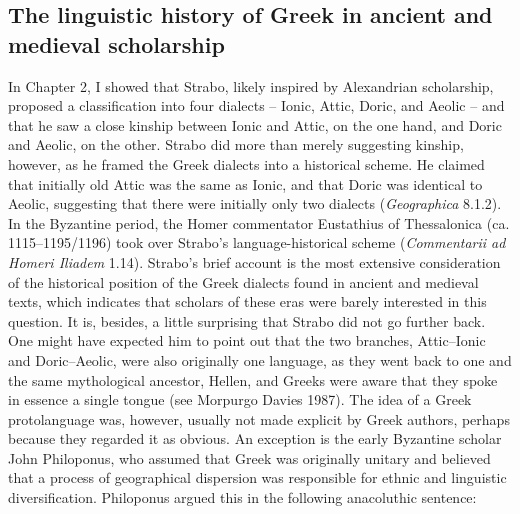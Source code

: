 \subsection{The linguistic history of Greek in ancient and medieval scholarship}
\hypertarget{Toc19704835}{}\begin{styleStandard}
In Chapter 2, I showed that Strabo, likely inspired by Alexandrian scholarship, proposed a classification into four dialects – Ionic, Attic, Doric, and Aeolic – and that he saw a close kinship between Ionic and Attic, on the one hand, and Doric and Aeolic, on the other. Strabo did more than merely suggesting kinship, however, as he framed the Greek dialects into a historical scheme. He claimed that initially old Attic was the same as Ionic, and that Doric was identical to Aeolic, suggesting that there were initially only two dialects (\textit{Geographica} 8.1.2). In the Byzantine period, the Homer commentator Eustathius of Thessalonica (ca. 1115–1195/1196) took over Strabo’s language-historical scheme (\textit{Commentarii ad Homeri Iliadem} 1.14). Strabo’s brief account is the most extensive consideration of the historical position of the Greek dialects found in ancient and medieval texts, which indicates that scholars of these eras were barely interested in this question. It is, besides, a little surprising that Strabo did not go further back. One might have expected him to point out that the two branches, Attic–Ionic and Doric–Aeolic, were also originally one language, as they went back to one and the same mythological ancestor, Hellen, and Greeks were aware that they spoke in essence a single tongue (see Morpurgo Davies 1987). The idea of a Greek protolanguage was, however, usually not made explicit by Greek authors, perhaps because they regarded it as obvious. An exception is the early Byzantine scholar John Philoponus, who assumed that Greek was originally unitary and believed that a process of geographical dispersion was responsible for ethnic and linguistic diversification. Philoponus argued this in the following anacoluthic sentence:
\end{styleStandard}

